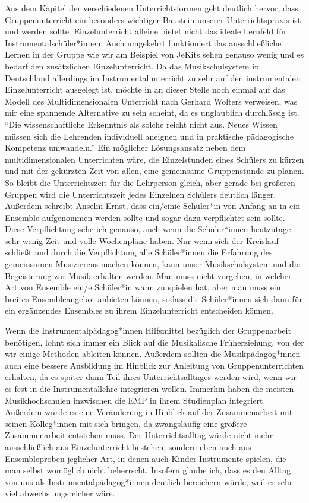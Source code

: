 Aus dem Kapitel der verschiedenen Unterrichtsformen geht deutlich hervor, dass
Gruppenunterricht ein besonders wichtiger Baustein unserer Unterrichtspraxis ist
und werden sollte. Einzelunterricht alleine bietet nicht das ideale Lernfeld für
Instrumentalschüler*innen. Auch umgekehrt funktioniert das ausschließliche
Lernen in der Gruppe wie wir am Beispiel von JeKits sehen genauso wenig und es
bedarf den zusätzlichen Einzelunterricht. Da das Musikschulsystem in Deutschland
allerdings im Instrumentalunterricht zu sehr auf den instrumentalen
Einzelunterricht ausgelegt ist, möchte in an dieser Stelle noch einmal auf das
Modell des Multidimensionalen Unterricht nach Gerhard Wolters verweisen, was mir
eine spannende Alternative zu sein scheint, da es unglaublich durchlässig ist.
\enquote{Die wissenschaftliche Erkenntnis als solche reicht nicht aus. Neues
Wissen müssen sich die Lehrenden individuell aneignen und in praktische
pädagogische Kompetenz umwandeln.}
\autocite[10]{losert:die_kunst_zu_unterrichten} Ein möglicher Lösungsansatz
neben dem multidimensionalen Unterrichten wäre, die Einzelstunden eines Schülers
zu kürzen und mit der gekürzten Zeit von allen, eine gemeinsame Gruppenstunde zu
planen. So bleibt die Unterrichtszeit für die Lehrperson gleich, aber gerade bei
größeren Gruppen wird die Unterrichtszeit jedes Einzelnen Schülers deutlich
länger.\autocite[33]{losert:die_kunst_zu_unterrichten} Außerdem schreibt Anselm
Ernst, dass ein/einie Schüler*in von Anfang an in ein Ensemble aufgenommen
werden sollte und sogar dazu verpflichtet sein sollte.
\autocite[61]{ernst:die_zukunftsfaehige_musikschule} Diese Verpflichtung sehe
ich genauso, auch wenn die Schüler*innen heutzutage sehr wenig Zeit und volle
Wochenpläne haben. Nur wenn sich der Kreislauf schließt und durch die
Verpflichtung alle Schüler*innen die Erfahrung des gemeinsamen Musizierens
machen können, kann unser Musikschulsystem und die Begeisterung zur Musik
erhalten werden. Man muss nicht vorgeben, in welcher Art von Ensemble ein/e
Schüler*in wann zu spielen hat, aber man muss ein breites Ensembleangebot
anbieten können, sodass die Schüler*innen sich dann für ein ergänzendes
Ensembles zu ihrem Einzelunterricht entscheiden können.

Wenn die Instrumentalpädagog*innen Hilfsmittel bezüglich der Gruppenarbeit
benötigen, lohnt sich immer ein Blick auf die Musikalische Früherziehung, von
der wir einige Methoden ableiten können. Außerdem sollten die Musikpädagog*innen
auch eine bessere Ausbildung im Hinblick zur Anleitung von Gruppenunterrichten
erhalten, da es später dann Teil ihres Unterrichtsalltages werden wird, wenn wir
es fest in die Instrumentallehre integrieren wollen. Immerhin haben die meisten
Musikhochschulen inzwischen die EMP in ihrem Studienplan integriert. Außerdem
würde es eine Veränderung in Hinblick auf der Zusammenarbeit mit seinen
Kolleg*innen mit sich bringen, da zwangsläufig eine größere Zusammenarbeit
entstehen muss. Der Unterrichtsalltag würde nicht mehr ausschließlich aus
Einzelunterricht bestehen, sondern eben auch aus Ensembleproben jeglicher Art,
in denen auch Kinder Instrumente spielen, die man selbst womöglich nicht
beherrscht. Insofern glaube ich, dass es den Alltag von uns als
Instrumentalpädagog*innen deutlich bereichern würde, weil er sehr viel
abwechslungsreicher wäre. 

